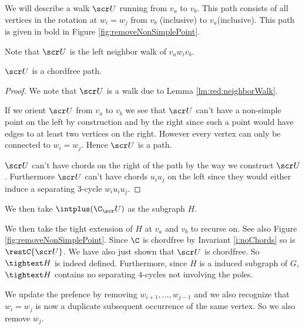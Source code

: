     We will describe a walk $\scr U$ running from $v_a$ to $v_b$. This path consists of all vertices in the rotation at $w_i=w_j$ from $v_b$ (inclusive) to $v_a$(inclusive). This path is given in bold in Figure \ref{fig:removeNonSimplePoint}.

    Note that $\U$ is the left neighbor walk of $v_a w_i v_b$.


    \begin{lemma}
    $\U$ is a chordfree path.
    \end{lemma}
    \begin{proof}
      We note that $\U$ is a walk due to Lemma \ref{lm:red:neighborWalk}.

      If we orient $\U$ from $v_a$ to $v_b$  we see that $\U$ can't have a non-simple point on the left by construction and by the right since such a point would have edges to at least two vertices on the right. However every vertex can only be connected to $w_i=w_j$. Hence $\U$ is a path.

      $\U$ can't have chords on the right of the path by the way we construct $\U$. Furthermore $\scr U$ can't have chords $u_i u_j$ on the left since they would either induce a separating $3$-cycle $w_i u_i u_j$.
    \end{proof}


    We then take $\intplus(\C_\U)$ as the subgraph $H$.

    We then take the tight extension of $H$ at $v_a$ and $v_b$ to recurse on. See also Figure \ref{fig:removeNonSimplePoint}. Since $\C$ is chordfree by Invariant \ref{i:noChords} so is $\restC{\U}$. We have also just shown that $\U$ is chordfree. So $\tightext H$ is indeed defined. Furthermore, since $H$ is a induced subgraph of $G$, $\tightext H$ contains no separating $4$-cycles not involving the poles.


     We update the prefence by removing $w_{i+1}, \ldots, w_{j-1}$ and we also recognize that $w_i = w_j$ is now a duplicate subsequent occurrence of the same vertex. So we also remove $w_j$.

